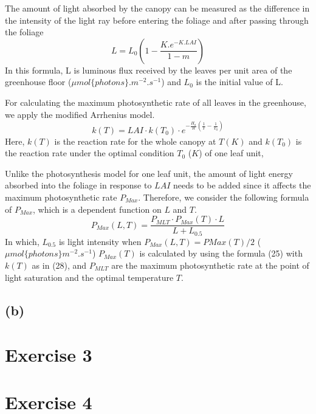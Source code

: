\documentclass[a4paper]{article}
\begin{document}
The amount of light absorbed by the canopy can be measured as the difference in the intensity of the light ray before entering the foliage and after passing through the foliage
\begin{equation}
  L =L_0(1 - \frac{K.e^{-K.LAI}}{1 - m})
\end{equation}
In this formula, L is luminous flux received by the leaves per unit area of the greenhouse floor ($\mu mol \{photons\}. m^{-2}. s^{-1}$) and $L_0$ is the initial value of L.

For calculating the maximum photosynthetic rate of all leaves in the greenhouse, we apply the modified Arrhenius model.
\begin{equation}
  k(T) = LAI \cdot k(T_0) \cdot e^{-\frac{H_a}{R}(\frac{1}{T} - \frac{1}{T_0})}
\end{equation}
Here, $k(T)$ is the reaction rate for the whole canopy at $T (K)$ and $k(T_0)$ is the reaction rate under the optimal condition $T_0$ ($K$) of one leaf unit,

Unlike the photosynthesis model for one leaf unit, the amount of light energy absorbed into the foliage in response to $LAI$ needs to be added since it affects the maximum photosynthetic rate $P_{Max}$. Therefore, we consider the following formula of $P_{Max}$, which is a dependent function on $L$ and $T$.
\begin{equation}
  P_{Max} (L,T) = \frac{P_{MLT} \cdot P_{Max}(T) \cdot L}{L + L_{0.5}}
\end{equation}
In which, $L_{0.5}$ is light intensity when $P_{Max} (L,T) = PMax(T)/2$ ($\mu mol \{photons\} m^{-2}.s^{-1}$)
$P_{Max}(T)$ is calculated by using the formula (25) with $k(T)$ as in (28), and $P_{MLT}$ are the maximum
photosynthetic rate at the point of light saturation and the optimal temperature $T$.


\subsection{(b)}


\newpage
\section{Exercise 3}


\newpage
\section{Exercise 4}
\end{document}
